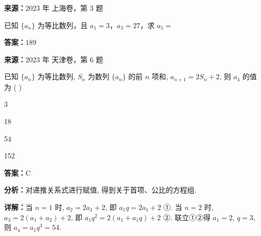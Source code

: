 \begin{question}[points=4]
\textbf{来源：}2023 年 上海卷，第 3 题\par
已知 $\{a_n\}$ 为等比数列，且 $a_1=3$，$a_3=27$，求 $a_5=$
\fillin[{$189$}]
\begin{solution}
\textbf{答案：}$189$
\end{solution}
\end{question}

\begin{question}[points=5]
\textbf{来源：}2023 年 天津卷，第 6 题\par
已知 $\{a_n\}$ 为等比数列, $S_n$ 为数列 $\{a_n\}$ 的前 $n$ 项和, $a_{n+1} = 2S_n + 2$, 则 $a_4$ 的值为 ( )
\begin{choices}
  \item 3
  \item 18
  \item 54
  \item 152
\end{choices}
\begin{solution}
\textbf{答案：}C

\textbf{分析：}对递推关系式进行赋值, 得到关于首项、公比的方程组.

\textbf{详解：}当 $n=1$ 时, $a_2 = 2a_1 + 2$, 即 $a_1 q = 2a_1 + 2$ ①. 当 $n=2$ 时, $a_3 = 2(a_1 + a_2) + 2$, 即 $a_1 q^2 = 2(a_1 + a_1 q) + 2$ ②. 联立①②得 $a_1 = 2$, $q = 3$, 则 $a_4 = a_1 q^3 = 54$.
\end{solution}
\end{question}

